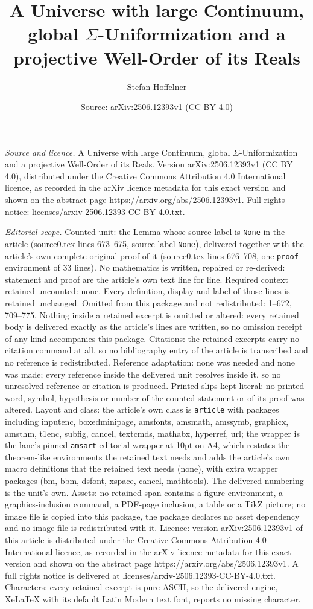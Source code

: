 \documentclass[10pt,a4paper]{amsart}
\title[A Universe with large Continuum, global $\Sigma$-Uniformizat]{A Universe with large Continuum, global $\Sigma$-Uniformization and a projective Well-Order of its Reals}
\author{Stefan Hoffelner}
\date{Source: arXiv:2506.12393v1 (CC BY 4.0)}
\begin{document}
\maketitle

\noindent\emph{Source and licence.} A Universe with large Continuum, global $\Sigma$-Uniformization and a projective Well-Order of its Reals. Version arXiv:2506.12393v1 (CC BY 4.0), distributed under the Creative Commons Attribution 4.0 International licence, as recorded in the arXiv licence metadata for this exact version and shown on the abstract page https://arxiv.org/abs/2506.12393v1. Full rights notice: licenses/arxiv-2506.12393-CC-BY-4.0.txt.\par\smallskip

\noindent\textit{Editorial scope.} Counted unit: the Lemma whose source label is \texttt{None} in the article (source0.tex lines 673--675, source label \texttt{None}), delivered together with the article's own complete original proof of it (source0.tex lines 676--708, one \texttt{proof} environment of 33 lines). No mathematics is written, repaired or re-derived: statement and proof are the article's own text line for line. Required context retained uncounted: none. Every definition, display and label of those lines is retained unchanged. Omitted from this package and not redistributed: 1--672, 709--775. Nothing inside a retained excerpt is omitted or altered: every retained body is delivered exactly as the article's lines are written, so no omission receipt of any kind accompanies this package. Citations: the retained excerpts carry no citation command at all, so no bibliography entry of the article is transcribed and no reference is redistributed. Reference adaptation: none was needed and none was made; every reference inside the delivered unit resolves inside it, so no unresolved reference or citation is produced. Printed slips kept literal: no printed word, symbol, hypothesis or number of the counted statement or of its proof was altered. Layout and class: the article's own class is \texttt{article} with packages including inputenc, boxedminipage, amsfonts, amsmath, amssymb, graphicx, amsthm, t1enc, subfig, cancel, textcmds, mathabx, hyperref, url; the wrapper is the lane's pinned \texttt{amsart} editorial wrapper at 10pt on A4, which restates the theorem-like environments the retained text needs and adds the article's own macro definitions that the retained text needs (none), with extra wrapper packages (bm, bbm, dsfont, xspace, cancel, mathtools). The delivered numbering is the unit's own. Assets: no retained span contains a figure environment, a graphics-inclusion command, a PDF-page inclusion, a table or a TikZ picture; no image file is copied into this package, the package declares no asset dependency and no image file is redistributed with it. Licence: version arXiv:2506.12393v1 of this article is distributed under the Creative Commons Attribution 4.0 International licence, as recorded in the arXiv licence metadata for this exact version and shown on the abstract page https://arxiv.org/abs/2506.12393v1. A full rights notice is delivered at licenses/arxiv-2506.12393-CC-BY-4.0.txt. Characters: every retained excerpt is pure ASCII, so the delivered engine, XeLaTeX with its default Latin Modern text font, reports no missing character.
\end{document}
